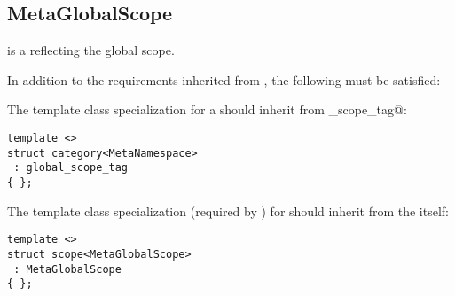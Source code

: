 \subsection{MetaGlobalScope}
\label{concept-MetaGlobalScope}

 is a  reflecting the global scope.

In addition to the requirements inherited from , the following must
be satisfied:

The \verb@category@ template class specialization for a  should
inherit from \verb@global_scope_tag@:

\begin{verbatim}
template <>
struct category<MetaNamespace>
 : global_scope_tag
{ };
\end{verbatim}

The \verb@scope@ template class specialization (required by ) for 
should inherit from the  itself:

\begin{verbatim}
template <>
struct scope<MetaGlobalScope>
 : MetaGlobalScope
{ };
\end{verbatim}

